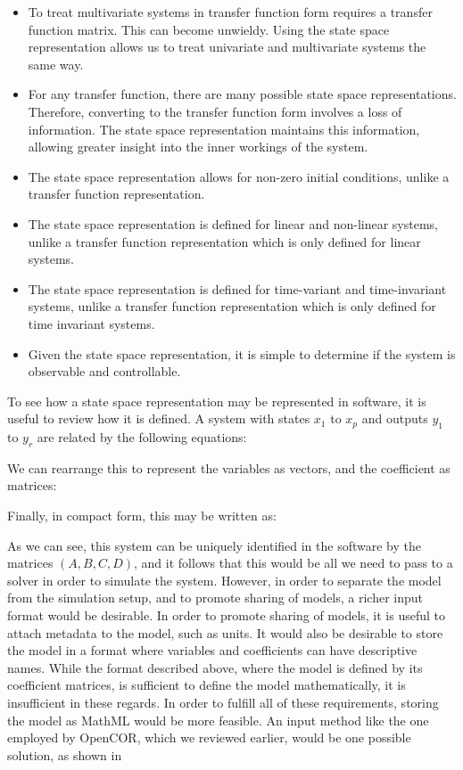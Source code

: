 \documentclass[\rootfolder/main.tex]{subfiles}
\begin{document}
\begin{itemize}
	\item To treat multivariate systems in transfer function form requires a transfer function matrix. This can become unwieldy.
		Using the state space representation allows us to treat univariate and multivariate systems the same way.
	\item For any transfer function, there are many possible state space representations. Therefore, converting to the transfer function form involves a loss of information.
		The state space representation maintains this information, allowing greater insight into the inner workings of the system.
	\item The state space representation allows for non-zero initial conditions, unlike a transfer function representation.
	\item The state space representation is defined for linear and non-linear systems, unlike a transfer function representation which is only defined for linear systems.
	\item The state space representation is defined for time-variant and time-invariant systems, unlike a transfer function representation which is only defined for time invariant systems.
	\item Given the state space representation, it is simple to determine if the system is observable and controllable.
\end{itemize}

To see how a state space representation may be represented in software, it is useful to review how it is defined.
A system with states $x_{1}$ to $x_{p}$ and outputs $y_{1}$ to $y_{r}$ are related by the following equations:


We can rearrange this to represent the variables as vectors, and the coefficient as matrices:

Finally, in compact form, this may be written as:

As we can see, this system can be uniquely identified in the software by the matrices $(A, B, C, D)$, and it follows that this would be all we need to pass to a solver in order to simulate the system.
However, in order to separate the model from the simulation setup, and to promote sharing of models, a richer input format would be desirable.
In order to promote sharing of models, it is useful to attach metadata to the model, such as units.
It would also be desirable to store the model in a format where variables and coefficients can have descriptive names.
While the format described above, where the model is defined by its coefficient matrices, is sufficient to define the model mathematically, it is insufficient in these regards.
In order to fulfill all of these requirements, storing the model as MathML would be more feasible.
An input method like the one employed by OpenCOR, which we reviewed earlier, would be one possible solution, as shown in %
\end{document}
